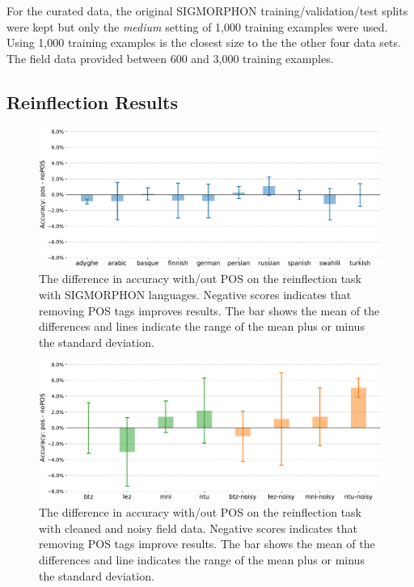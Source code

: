 For the curated data, the original SIGMORPHON training/validation/test splits were kept but only the \textit{medium} setting of 1,000 training examples were used. Using 1,000 training examples is the closest size to the the other four data sets. The field data provided between 600 and 3,000 training examples. 


\subsection{Reinflection Results}
\label{sec:inflectionresults}

\begin{figure}[t]
    \centering
    \includegraphics[width=35em]{figs/plot_2018data.pdf}
    \caption{The difference in accuracy with/out POS on the reinflection task with SIGMORPHON languages. Negative scores indicates that removing POS tags improves results. The bar shows the mean of the differences and lines indicate the range of the mean plus or minus the standard deviation.}
    \label{fig:sigreinfl}
\end{figure}

\begin{figure}[t]
    \centering
    \includegraphics[width=41em]{figs/plot_igtdata.pdf}
    \caption{The difference in accuracy with/out POS on the reinflection task with cleaned and noisy field data. Negative scores indicates that removing POS tags improve results. The bar shows the mean of the differences and line indicates the range of the mean plus or minus the standard deviation.}
    \label{fig:igtreinfl}
\end{figure}

